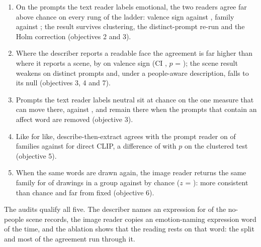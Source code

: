 \begin{enumerate}\setlength{\itemsep}{2pt}
\item On the \nEmotional{} prompts the text reader labels emotional, the two readers agree far above chance on every rung of the ladder: valence sign \FullEmoSignObs{} against \FullEmoSignNull{}, family \FullEmoFamObs{} against \FullEmoFamNull{}; the result survives clustering, the distinct-prompt re-run and the Holm correction (objectives 2 and 3).
\item Where the describer reports a readable face the agreement is far higher than where it reports a scene, by \DiffSignPp{} on valence sign (CI \DiffSignCi{}, $p$ = \DiffSignP{}); the scene result weakens on distinct prompts and, under a people-aware description, falls to its null (objectives 3, 4 and 7).
\item Prompts the text reader labels neutral sit at chance on the one measure that can move there, \CtrlVaObs{} against \CtrlVaNull{}, and remain there when the \CtrlFlagged{} prompts that contain an affect word are removed (objective 3).
\item Like for like, describe-then-extract agrees with the prompt reader on \McDeFam{} of families against \McClipFam{} for direct CLIP, a difference of \McDiffFamPp{} with $p$ \McClusterFamP{} on the clustered test (objective 5).
\item When the same words are drawn again, the image reader returns the same family for \ConsFam{} of drawings in a group against \ConsFamNull{} by chance ($z$ = \ConsFamZ{}): more consistent than chance and far from fixed (objective 6).
\end{enumerate}

The audits qualify all five. The describer names an expression for \DescScenePeopleZeroExpr{} of the \DescScenePeopleZero{} no-people scene records, the image reader copies an emotion-naming expression word \DescCopyStrict{} of the time, and the ablation shows that the reading rests on that word: the split and most of the agreement run through it.
